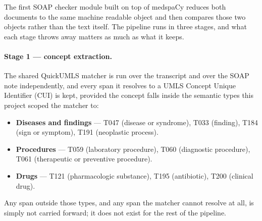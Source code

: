 %
%



The first SOAP checker module built on top of medspaCy reduces both documents to
the same machine readable object and then compares those two objects rather than
the text itself. The pipeline runs in three stages, and what each stage throws
away matters as much as what it keeps.

\paragraph{Stage 1 --- concept extraction.}
The shared QuickUMLS matcher \cite{soldaini2016quickumls} is run over the
transcript and over the SOAP note independently, and every span it resolves to a
UMLS Concept Unique Identifier (CUI) is kept, provided the concept falls inside
the semantic types this project scoped the matcher to:
\begin{itemize}
    \item \textbf{Diseases and findings} --- T047 (disease or syndrome), T033
          (finding), T184 (sign or symptom), T191 (neoplastic process).
    \item \textbf{Procedures} --- T059 (laboratory procedure), T060 (diagnostic
          procedure), T061 (therapeutic or preventive procedure).
    \item \textbf{Drugs} --- T121 (pharmacologic substance), T195 (antibiotic),
          T200 (clinical drug).
\end{itemize}
Any span outside those types, and any span the matcher cannot resolve at all, is
simply not carried forward; it does not exist for the rest of the pipeline.


